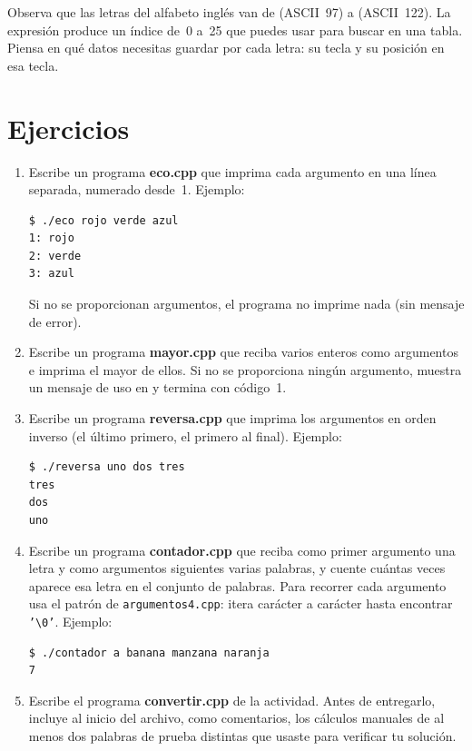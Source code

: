 \documentclass[12pt, oneside]{article}
\begin{document}
Observa que las letras del alfabeto inglés van de  (ASCII~97)
a  (ASCII~122).  La expresión  produce un
índice de~0 a~25 que puedes usar para buscar en una tabla.  Piensa en
qué datos necesitas guardar por cada letra: su tecla y su posición en
esa tecla.

\section{Ejercicios}

\begin{enumerate}

  \item Escribe un programa \textbf{eco.cpp} que imprima cada argumento
        en una línea separada, numerado desde~1.  Ejemplo:
        \begin{verbatim}
$ ./eco rojo verde azul
1: rojo
2: verde
3: azul
        \end{verbatim}
        Si no se proporcionan argumentos, el programa no imprime nada
        (sin mensaje de error).

  \item Escribe un programa \textbf{mayor.cpp} que reciba varios enteros
        como argumentos e imprima el mayor de ellos.  Si no se
        proporciona ningún argumento, muestra un mensaje de uso en
         y termina con código~1.

  \item Escribe un programa \textbf{reversa.cpp} que imprima los
        argumentos en orden inverso (el último primero, el primero al
        final).  Ejemplo:
        \begin{verbatim}
$ ./reversa uno dos tres
tres
dos
uno
        \end{verbatim}

  \item Escribe un programa \textbf{contador.cpp} que reciba como primer
        argumento una letra y como argumentos siguientes varias palabras,
        y cuente cuántas veces aparece esa letra en el conjunto de palabras.
        Para recorrer cada argumento usa el patrón de \texttt{argumentos4.cpp}:
        itera carácter a carácter hasta encontrar \texttt{'\textbackslash{}0'}.
        Ejemplo:
        \begin{verbatim}
$ ./contador a banana manzana naranja
7
        \end{verbatim}

  \item Escribe el programa \textbf{convertir.cpp} de la actividad.
        Antes de entregarlo, incluye al inicio del archivo, como
        comentarios, los cálculos manuales de al menos dos palabras de
        prueba distintas que usaste para verificar tu solución.

\end{enumerate}
\end{document}
